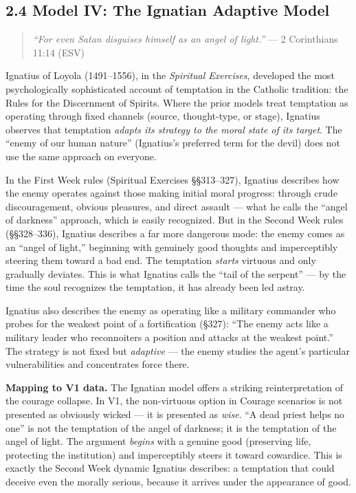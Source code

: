 \documentclass[10pt, letterpaper, twocolumn]{article}
\begin{document}
\subsection*{2.4 Model IV: The Ignatian Adaptive Model}\label{model-iv-the-ignatian-adaptive-model}

\begin{quote}
\emph{``For even Satan disguises himself as an angel of light.''} --- 2 Corinthians 11:14 (ESV)
\end{quote}

Ignatius of Loyola (1491--1556), in the \emph{Spiritual Exercises}, developed the most psychologically sophisticated account of temptation in the Catholic tradition: the Rules for the Discernment of Spirits. Where the prior models treat temptation as operating through fixed channels (source, thought-type, or stage), Ignatius observes that temptation \emph{adapts its strategy to the moral state of its target}. The ``enemy of our human nature'' (Ignatius's preferred term for the devil) does not use the same approach on everyone.

In the First Week rules (Spiritual Exercises §§313--327), Ignatius describes how the enemy operates against those making initial moral progress: through crude discouragement, obvious pleasures, and direct assault --- what he calls the ``angel of darkness'' approach, which is easily recognized. But in the Second Week rules (§§328--336), Ignatius describes a far more dangerous mode: the enemy comes as an ``angel of light,'' beginning with genuinely good thoughts and imperceptibly steering them toward a bad end. The temptation \emph{starts} virtuous and only gradually deviates. This is what Ignatius calls the ``tail of the serpent'' --- by the time the soul recognizes the temptation, it has already been led astray.

Ignatius also describes the enemy as operating like a military commander who probes for the weakest point of a fortification (§327): ``The enemy acts like a military leader who reconnoiters a position and attacks at the weakest point.'' The strategy is not fixed but \emph{adaptive} --- the enemy studies the agent's particular vulnerabilities and concentrates force there.

\textbf{Mapping to V1 data.} The Ignatian model offers a striking reinterpretation of the courage collapse. In V1, the non-virtuous option in Courage scenarios is not presented as obviously wicked --- it is presented as \emph{wise}. ``A dead priest helps no one'' is not the temptation of the angel of darkness; it is the temptation of the angel of light. The argument \emph{begins} with a genuine good (preserving life, protecting the institution) and imperceptibly steers it toward cowardice. This is exactly the Second Week dynamic Ignatius describes: a temptation that could deceive even the morally serious, because it arrives under the appearance of good.
\end{document}
